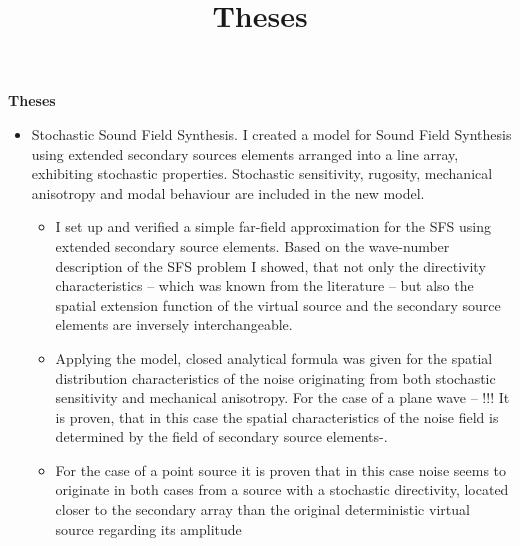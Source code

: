 \documentclass[a4paper,10pt]{article}
\title{Theses}
\date{}
\begin{document}
\begin{center}
  \textbf{\Large Theses}\\[0.5cm]
\end{center}

\begin{itemize}
\item Stochastic Sound Field Synthesis. I created a model for Sound Field Synthesis using extended secondary sources elements arranged into a line array, exhibiting stochastic properties. Stochastic sensitivity, rugosity, mechanical anisotropy and modal behaviour are included in the new model.
	
	\begin{itemize}
	\item I set up and verified a simple far-field approximation for the SFS using extended secondary source elements. Based on the wave-number description of the SFS problem I showed, that not only the directivity characteristics -- which was known from the literature -- but also the spatial extension function of the virtual source and the secondary source elements are inversely interchangeable.
	\item Applying the model, closed analytical formula was given for the spatial distribution characteristics of the noise originating from both stochastic sensitivity and mechanical anisotropy. For the case of a plane wave -- !!! It is proven, that in this case the spatial characteristics of the noise field is determined by the field of secondary source 				elements-. 	
		
	\item For the case of a point source it is proven that in this case noise seems to originate in both cases from a source with a stochastic directivity, located closer to the secondary array than the original deterministic virtual source regarding its amplitude
	\end{itemize}
	

\end{itemize}
\end{document}
